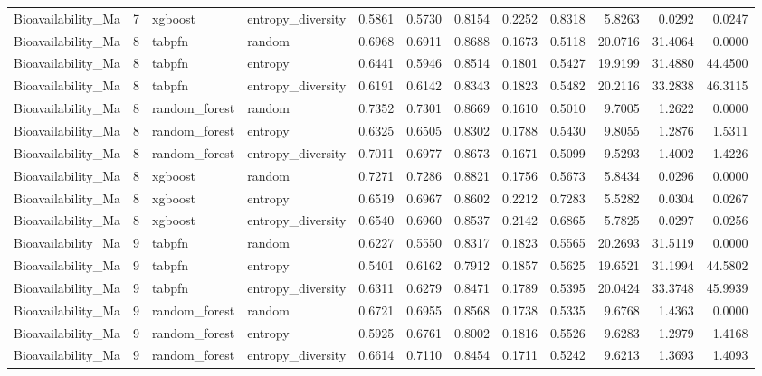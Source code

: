 \begin{tabular}{lrllrrrrrrrr}
Bioavailability_Ma & 7 & xgboost & entropy_diversity & 0.5861 & 0.5730 & 0.8154 & 0.2252 & 0.8318 & 5.8263 & 0.0292 & 0.0247 \\
Bioavailability_Ma & 8 & tabpfn & random & 0.6968 & 0.6911 & 0.8688 & 0.1673 & 0.5118 & 20.0716 & 31.4064 & 0.0000 \\
Bioavailability_Ma & 8 & tabpfn & entropy & 0.6441 & 0.5946 & 0.8514 & 0.1801 & 0.5427 & 19.9199 & 31.4880 & 44.4500 \\
Bioavailability_Ma & 8 & tabpfn & entropy_diversity & 0.6191 & 0.6142 & 0.8343 & 0.1823 & 0.5482 & 20.2116 & 33.2838 & 46.3115 \\
Bioavailability_Ma & 8 & random_forest & random & 0.7352 & 0.7301 & 0.8669 & 0.1610 & 0.5010 & 9.7005 & 1.2622 & 0.0000 \\
Bioavailability_Ma & 8 & random_forest & entropy & 0.6325 & 0.6505 & 0.8302 & 0.1788 & 0.5430 & 9.8055 & 1.2876 & 1.5311 \\
Bioavailability_Ma & 8 & random_forest & entropy_diversity & 0.7011 & 0.6977 & 0.8673 & 0.1671 & 0.5099 & 9.5293 & 1.4002 & 1.4226 \\
Bioavailability_Ma & 8 & xgboost & random & 0.7271 & 0.7286 & 0.8821 & 0.1756 & 0.5673 & 5.8434 & 0.0296 & 0.0000 \\
Bioavailability_Ma & 8 & xgboost & entropy & 0.6519 & 0.6967 & 0.8602 & 0.2212 & 0.7283 & 5.5282 & 0.0304 & 0.0267 \\
Bioavailability_Ma & 8 & xgboost & entropy_diversity & 0.6540 & 0.6960 & 0.8537 & 0.2142 & 0.6865 & 5.7825 & 0.0297 & 0.0256 \\
Bioavailability_Ma & 9 & tabpfn & random & 0.6227 & 0.5550 & 0.8317 & 0.1823 & 0.5565 & 20.2693 & 31.5119 & 0.0000 \\
Bioavailability_Ma & 9 & tabpfn & entropy & 0.5401 & 0.6162 & 0.7912 & 0.1857 & 0.5625 & 19.6521 & 31.1994 & 44.5802 \\
Bioavailability_Ma & 9 & tabpfn & entropy_diversity & 0.6311 & 0.6279 & 0.8471 & 0.1789 & 0.5395 & 20.0424 & 33.3748 & 45.9939 \\
Bioavailability_Ma & 9 & random_forest & random & 0.6721 & 0.6955 & 0.8568 & 0.1738 & 0.5335 & 9.6768 & 1.4363 & 0.0000 \\
Bioavailability_Ma & 9 & random_forest & entropy & 0.5925 & 0.6761 & 0.8002 & 0.1816 & 0.5526 & 9.6283 & 1.2979 & 1.4168 \\
Bioavailability_Ma & 9 & random_forest & entropy_diversity & 0.6614 & 0.7110 & 0.8454 & 0.1711 & 0.5242 & 9.6213 & 1.3693 & 1.4093 \\

\end{tabular}
